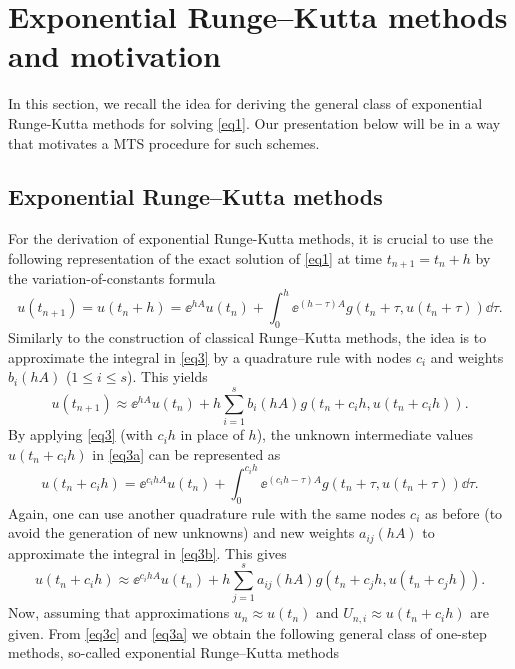 \section{Exponential Runge--Kutta methods and motivation}
\label{sec2}
In this section, we recall the idea for deriving the general class of exponential Runge-Kutta methods for solving \eqref{eq1}. Our presentation below will be in a way that motivates a MTS procedure for such schemes. 
\subsection{Exponential Runge--Kutta methods}
\label{sec2.1}
For the derivation of exponential Runge-Kutta methods, it is crucial to use the following representation of the exact solution of \eqref{eq1} at time $t_{n+1}=t_n +h$ by
the variation-of-constants formula
\begin{equation} \label{eq3}
u(t_{n+1})=u(t_n+h)=\ee^{hA}u(t_n) + \int_{0}^{h} \ee^{(h-\tau)A} g(t_n+\tau, u(t_n+\tau)) \dd\tau.
\end{equation}
Similarly to the construction of classical Runge--Kutta methods, the idea is to approximate the integral in \eqref{eq3} by a quadrature rule with nodes $c_i$ and weights $b_i(hA)$ ($1\leq i\leq s$). 
This yields
\begin{equation} \label{eq3a}
u(t_{n+1})\approx \ee^{hA}u(t_n) + h\sum_{i=1}^{s} b_i(hA)g(t_n+c_i h, u(t_n+c_i h)).
\end{equation}
By applying \eqref{eq3} (with $c_i h$ in place of $h$), the unknown intermediate values $u(t_n+c_i h)$ in \eqref{eq3a} can be represented as 
\begin{equation} \label{eq3b}
u(t_n+c_i h)=\ee^{c_i hA}u(t_n) + \int_{0}^{c_i h} \ee^{(c_i h-\tau)A} g(t_n+\tau, u(t_n+\tau)) \dd\tau.
\end{equation}
Again, one can use another quadrature rule with the same nodes $c_i$ as before (to avoid the generation of new unknowns) and new weights $a_{ij}(hA)$ to approximate the integral in \eqref{eq3b}. This gives 
\begin{equation} \label{eq3c}
u(t_n+c_i h)\approx \ee^{c_i hA}u(t_n) + h\sum_{j=1}^{s} a_{ij}(hA)g(t_n+c_j h, u(t_n+c_j h)).
\end{equation}
Now, assuming that approximations 
$u_n \approx u(t_n)$ and $U_{n,i} \approx u(t_n+c_i h)$ are given. From \eqref{eq3c} and \eqref{eq3a} we obtain the following general class of one-step methods, so-called exponential Runge--Kutta methods
